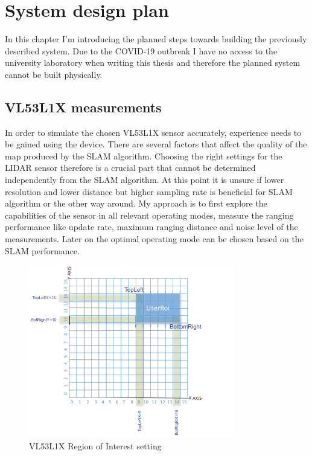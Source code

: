 \chapter{System design plan} \label{chap:system_design}
In this chapter I'm introducing the planned steps towards building the previously described system. Due to the 
COVID-19 outbreak I have no access to the university laboratory when writing this thesis and therefore the planned 
system cannot be built physically. 

\section{VL53L1X measurements} \label{sect:vl53l1x_measurements}
In order to simulate the chosen VL53L1X sensor accurately, experience needs to be gained using the device. 
There are several factors that affect the quality of the map produced by the SLAM algorithm. Choosing the right
settings for the LIDAR sensor therefore is a crucial part that cannot be determined independently from the SLAM 
algorithm. At this point it is unsure if lower resolution and lower distance but higher sampling rate is beneficial 
for SLAM algorithm or the other way around. My approach is to first explore the capabilities of the sensor in 
all relevant operating modes, measure the ranging performance like update rate, maximum ranging distance and 
noise level of the measurements. Later on the optimal operating mode can be chosen based on the SLAM performance. 

\begin{figure}[!hb]
    \centering
    \includegraphics[width=90mm, keepaspectratio]{figures/vl53l1x_roi_setup.png}
    \caption{VL53L1X Region of Interest setting \cite{VL53L1XApplicationNote}}
    \label{fig:vl53l1x_roi_setup}
\end{figure}


